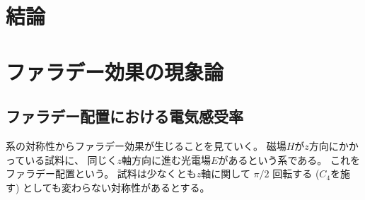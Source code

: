 \documentclass[9pt,dvipdfmx,a4paper]{jsarticle}
\begin{document}
\section{結論}



\nocite{*}
\appendix
\section{ファラデー効果の現象論}
\subsection{ファラデー配置における電気感受率}
系の対称性からファラデー効果が生じることを見ていく。
磁場\(H\)が\(z\)方向にかかっている試料に、
同じく\(z\)軸方向に進む光電場\(E\)があるという系である。
これをファラデー配置という。
試料は少なくとも\(z\)軸に関して \(\pi/2\) 回転する (\(C_4\)を施す) としても変わらない対称性があるとする。
\end{document}
